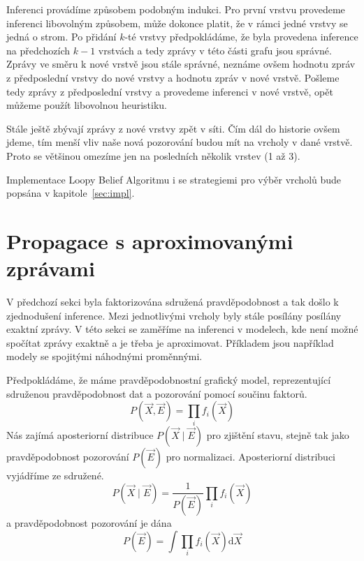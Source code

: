 Inferenci provádíme způsobem podobným indukci.
Pro první vrstvu provedeme inferenci libovolným způsobem, může dokonce platit, že v rámci jedné vrstvy se jedná o strom.
Po přidání $k$-té vrstvy předpokládáme, že byla provedena inference na předchozích $k-1$ vrstvách a tedy zprávy v této části grafu jsou správné.
Zprávy ve směru k nové vrstvě jsou stále správné, neznáme ovšem hodnotu zpráv z předposlední vrstvy do nové vrstvy a hodnotu zpráv v nové vrstvě.
Pošleme tedy zprávy z předposlední vrstvy a provedeme inferenci v nové vrstvě, opět můžeme použít libovolnou heuristiku.

Stále ještě zbývají zprávy z nové vrstvy zpět v síti.
Čím dál do historie ovšem jdeme, tím menší vliv naše nová pozorování budou mít na vrcholy v dané vrstvě.
Proto se většinou omezíme jen na posledních několik vrstev (1 až 3).

Implementace Loopy Belief Algoritmu i se strategiemi pro výběr vrcholů bude popsána v kapitole~\ref{sec:impl}.

\section{Propagace s aproximovanými zprávami}

V předchozí sekci byla faktorizována sdružená pravděpodobnost a tak došlo k zjednodušení inference.
Mezi jednotlivými vrcholy byly stále posílány posílány exaktní zprávy.
V této sekci se zaměříme na inferenci v modelech, kde není možné spočítat zprávy exaktně a je třeba je aproximovat.
Příkladem jsou například modely se spojitými náhodnými proměnnými.

Předpokládáme, že máme pravděpodobnostní grafický model, reprezentující sdruženou pravděpodobnost dat a pozorování pomocí součinu faktorů.
\begin{equation}
P(\vec{X}, \vec{E}) = \prod_i f_i(\vec{X})
\end{equation}
Nás zajímá aposteriorní distribuce $P(\vec{X} \mid \vec{E})$ pro zjištění stavu, stejně tak jako pravděpodobnost pozorování $P(\vec{E})$ pro normalizaci.
Aposteriorní distribuci vyjádříme ze sdružené.
\begin{equation}
P(\vec{X} \mid \vec{E}) = \frac{1}{P(\vec{E})} \prod_i f_i(\vec{X})
\end{equation}
a pravděpodobnost pozorování je dána
\begin{equation}
P(\vec{E}) = \int \prod_i f_i(\vec{X}) \mathrm{d}\vec{X}
\end{equation}

